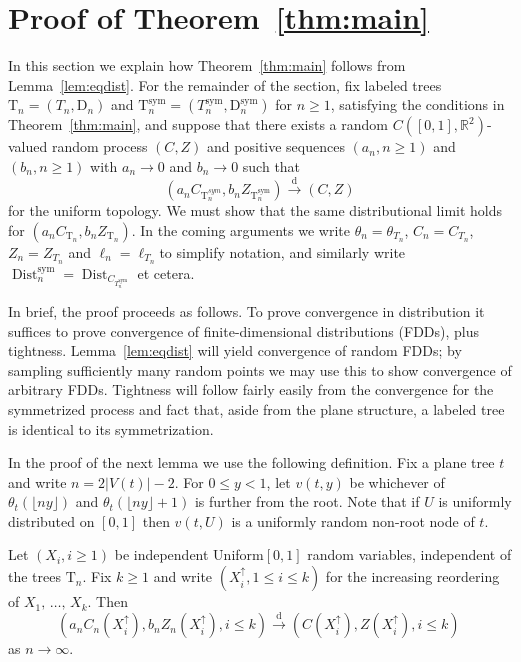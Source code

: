 \documentclass[AHL,Unicode,longabstracts,published]{cedram}
\providecommand{\R}{}
\renewcommand{\R}{\mathbb{R}}
\newcommand{\rD}{\mathrm{D}}
\newcommand{\rT}{\mathrm{T}}
\DeclareMathOperator{\sym}{sym}
\DeclareMathOperator{\Dist}{Dist}
\newcommand{\unif}{\ensuremath{X}}
\newcommand{\convdist}{\ensuremath{\stackrel{\mathrm{d}}{\rightarrow}}}
\newcommand{\R}{\mathbb{R}}
\begin{document}
\section{Proof of Theorem~\ref{thm:main}}\label{sec:proofMain}
In this section we explain how Theorem~\ref{thm:main} follows from Lemma~\ref{lem:eqdist}. For the remainder of the section, fix labeled trees $\rT_n=(T_n,\rD_n)$ and $\rT_n^{\sym}=(T_n^{\sym},\rD_n^{\sym})$ for $n \ge 1$, satisfying the conditions in Theorem~\ref{thm:main}, and suppose that there exists a random $C([0,1],\R^2)$-valued random process $(C,Z)$ and positive sequences $(a_n,n \ge 1)$ and $(b_n,n \ge 1)$ with $a_n \to 0$ and $b_n \to 0$ such that
\[
\left(a_nC_{\rT_n^{sym}},b_nZ_{\rT_n^{\sym}}\right) \convdist (C,Z)
\]
for the uniform topology. We must show that the same distributional limit holds for $(a_nC_{\rT_n},b_nZ_{\rT_n})$. In the coming arguments we write $\theta_n=\theta_{T_n}$, $C_n=C_{T_n}$, $Z_n=Z_{T_n}$ and $\ell_n=\ell_{T_n}$to simplify notation, and similarly write $\Dist_n^{\sym} = \Dist_{C_{T_n^{\sym}}}$ et cetera.

In brief, the proof proceeds as follows. To prove convergence in distribution it suffices to prove convergence of finite-dimensional distributions (FDDs), plus tightness. Lemma~\ref{lem:eqdist} will yield convergence of random FDDs; by sampling sufficiently many random points we may use this to show convergence of arbitrary FDDs. Tightness will follow fairly easily from the convergence for the symmetrized process and fact that, aside from the plane structure, a labeled tree is identical to its symmetrization.


In the proof of the next lemma we use the following definition. Fix a plane tree $t$ and write $n=2|V(t)|-2$. For $0 \le y <1$, let $v(t,y)$ be whichever of $\theta_t(\lfloor n y \rfloor)$ and $\theta_t(\lfloor n y \rfloor+1)$ is further from the root. Note that if $U$ is uniformly distributed on $[0,1]$ then $v(t,U)$ is a uniformly random non-root node of $t$.
\begin{lemm}\label{lem:fdd}
Let $(\unif_i,i \ge 1)$ be independent Uniform$[0,1]$ random variables, independent of the trees $\rT_n$. Fix $k \ge 1$ and write $(\unif_i^\uparrow,1 \le i \le k)$ for the increasing reordering of $\unif_1,\,\ldots,\,\unif_k$. Then
\[
\left(a_n C_{n}\left(\unif_i^\uparrow\right), b_n Z_{n}\left(\unif_i^\uparrow\right),i \le k\right) \convdist \left(C\left(\unif_i^\uparrow\right),Z\left(\unif_i^\uparrow\right),i \le k\right)\,
\]
as $n \to \infty$.
\end{lemm}
\end{document}

